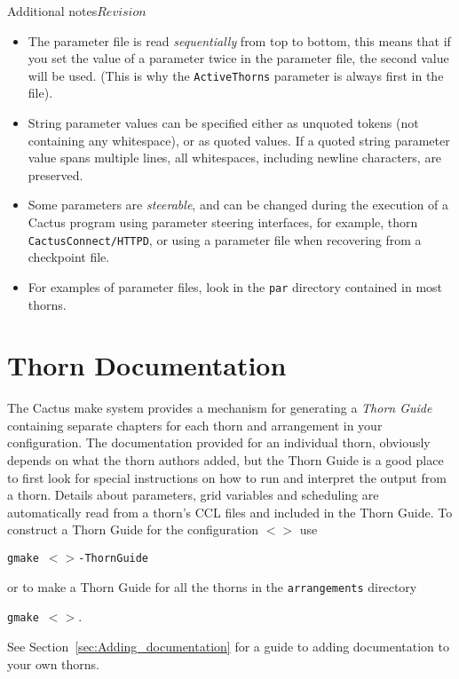 \begin{cactuspart}{Additional notes}{}{$Revision$}
\begin{itemize}
\item{} The parameter file is read \emph{sequentially} from top to bottom,
        this means that if you set the value of a parameter twice in
        the parameter file, the second value will be used. (This is
        why the \texttt{ActiveThorns} parameter is always first in the file).

\item{} String parameter values can be specified either as unquoted tokens (not
        containing any whitespace), or as quoted values. If a quoted string
        parameter value spans multiple lines, all whitespaces, including newline
        characters, are preserved.

\item{} Some parameters are \textit{steerable}, and can be changed during
        the execution of a Cactus program using parameter steering interfaces,
        for example, thorn \texttt{CactusConnect/HTTPD}, or using a
        parameter file when recovering from a checkpoint file.

\item{} For examples of parameter files, look in the \texttt{par} directory
        contained in most thorns.

\end{itemize}

\section{Thorn Documentation}
\label{sec:thdo}

The Cactus make system provides a mechanism for generating a
\textit{Thorn Guide} containing separate chapters for each thorn and
arrangement in your configuration. The documentation provided for an
individual thorn, obviously depends on what the thorn authors added,
but the Thorn Guide is a good place to first look for special
instructions on how to run and interpret the output from a thorn.
Details about parameters, grid variables and scheduling are
automatically read from a thorn's CCL files and included in the Thorn
Guide. To construct a Thorn Guide for the configuration
\texttt{$<$$>$} use

\texttt{gmake $<$$>$-ThornGuide}

or to make a Thorn Guide for all the thorns in the \texttt{arrangements} directory

\texttt{gmake $<$$>$}.

See Section~\ref{sec:Adding_documentation} for a guide to adding
documentation to your own thorns.



\end{cactuspart}
